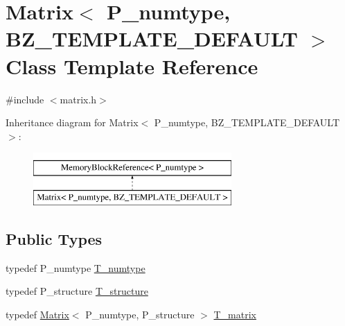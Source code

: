 \hypertarget{classMatrix}{}\section{Matrix$<$ P\+\_\+numtype, B\+Z\+\_\+\+T\+E\+M\+P\+L\+A\+T\+E\+\_\+\+D\+E\+F\+A\+U\+L\+T $>$ Class Template Reference}
\label{classMatrix}


{\ttfamily \#include $<$matrix.\+h$>$}

Inheritance diagram for Matrix$<$ P\+\_\+numtype, B\+Z\+\_\+\+T\+E\+M\+P\+L\+A\+T\+E\+\_\+\+D\+E\+F\+A\+U\+L\+T $>$\+:\begin{figure}[H]
\begin{center}
\leavevmode
\includegraphics[height=2.000000cm]{classMatrix}
\end{center}
\end{figure}
\subsection*{Public Types}
\begin{DoxyCompactItemize}
\item 
typedef P\+\_\+numtype \hyperlink{classMatrix_aa2e0c7f09cbf31c078ad0b0977588e70}{T\+\_\+numtype}
\item 
typedef P\+\_\+structure \hyperlink{classMatrix_a0441c5aed57ace2b56e48fc618b081bf}{T\+\_\+structure}
\item 
typedef \hyperlink{classMatrix}{Matrix}$<$ P\+\_\+numtype, P\+\_\+structure $>$ \hyperlink{classMatrix_ae07f7dfb83325c5854333ed7e85d2ebb}{T\+\_\+matrix}
\end{DoxyCompactItemize}
